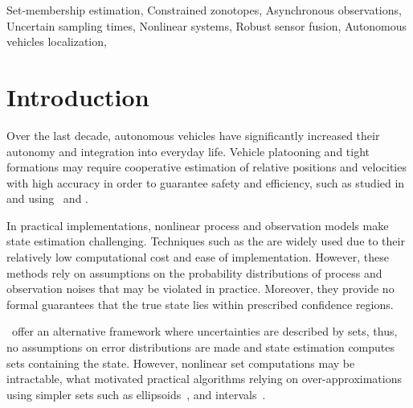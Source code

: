 \documentclass{ifacconf}
\begin{document}
\begin{frontmatter}

\begin{keyword}
  
 Set-membership estimation,
  Constrained zonotopes,
  Asynchronous observations,
  Uncertain sampling times,
  Nonlinear systems,
  Robust sensor fusion,
  Autonomous vehicles localization,
\end{keyword}

\end{frontmatter}
\section{Introduction}

Over the last decade, autonomous vehicles have significantly increased their autonomy and integration into everyday life. Vehicle platooning and tight formations may require cooperative estimation of relative positions and velocities with high accuracy in order to guarantee safety and efficiency, such as studied in \cite{meng2021v2v} and \cite{gao2022performance} using \vtwoxshort\ and \uwbshort.


In practical implementations, nonlinear process and observation models make state estimation challenging. Techniques such as the \ekf{} are widely used due to their relatively low computational cost and ease of implementation.
However, these methods rely on assumptions on the probability distributions of process and observation noises that may be violated in practice.
Moreover, they provide no formal guarantees that the true state lies within prescribed confidence regions.

\smfs\ offer an alternative framework where uncertainties are described by sets, thus, no assumptions on error distributions are made and state estimation computes sets containing the state.
However, nonlinear set computations may be intractable, what motivated practical algorithms relying on over-approximations using simpler sets such as ellipsoids~\citep{Bolting2018b}, and intervals~\citep{RohouJaulin2021}.
\end{document}

